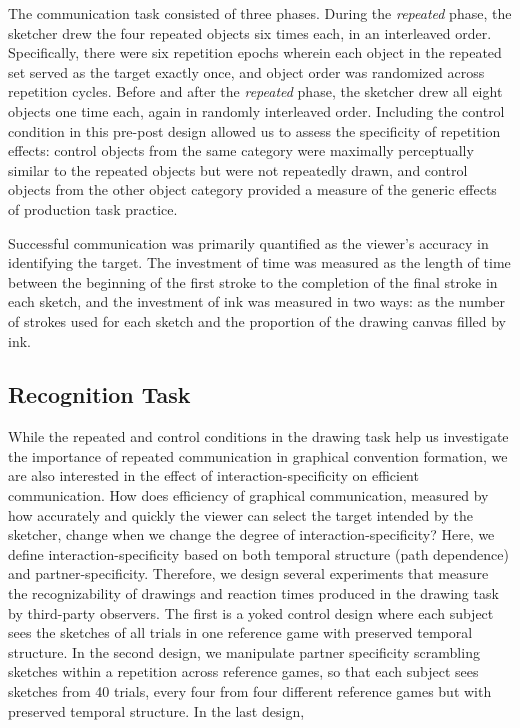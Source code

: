 \documentclass[10pt,letterpaper]{article}
\begin{document}
The communication task consisted of three phases. 
During the \textit{repeated} phase, the sketcher drew the four repeated objects six times each, in an interleaved order.
Specifically, there were six repetition epochs wherein each object in the repeated set served as the target exactly once, and object order was randomized across repetition cycles. 
Before and after the \textit{repeated} phase, the sketcher drew all eight objects one time each, again in randomly interleaved order. 
Including the control condition in this pre-post design allowed us to assess the specificity of repetition effects: control objects from the same category were maximally perceptually similar to the repeated objects but were not repeatedly drawn, and control objects from the other object category provided a measure of the generic effects of production task practice. 

Successful communication was primarily quantified as the viewer's accuracy in identifying the target. 
The investment of time was measured as the length of time between the beginning of the first stroke to the completion of the final stroke in each sketch, and the investment of ink was measured in two ways: as the number of strokes used for each sketch and the proportion of the drawing canvas filled by ink.


\subsection{Recognition Task}
While the repeated and control conditions in the drawing task help us investigate the importance of repeated communication in graphical convention formation, we are also interested in the effect of interaction-specificity on efficient communication. 
How does efficiency of graphical communication, measured by how accurately and quickly the viewer can select the target intended by the sketcher, change when we change the degree of interaction-specificity? 
Here, we define interaction-specificity based on both temporal structure (path dependence) and partner-specificity. 
Therefore, we design several experiments that measure the recognizability of drawings and reaction times produced in the drawing task by third-party observers. 
The first is a yoked control design where each subject sees the sketches of all trials in one reference game with preserved temporal structure. 
In the second design, we manipulate partner specificity scrambling sketches within a repetition across reference games, so that each subject sees sketches from 40 trials, every four from four different reference games but with preserved temporal structure. In the last design,
\end{document}
